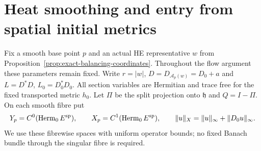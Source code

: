 \section{Heat smoothing and entry from spatial initial metrics}
\label{sec:spatial-entry}

Fix a smooth base point $p$ and an actual HE representative
$w$ from Proposition~\ref{prop:exact-balancing-coordinates}.
Throughout the flow argument these parameters remain fixed.
Write $r=|w|$, $D=D_{\mathcal A_p(w)}=D_0+a$ and
$L=D^*D$, $L_0=D_0^*D_0$. All section variables are
Hermitian and trace free for the fixed transported metric $h_0$.
Let $\Pi$ be the split projection onto $\mathfrak h$ and
$Q=I-\Pi$. On each smooth fibre put
\begin{equation}\label{eq:flow-banach-spaces}
 Y_p=C^0(\operatorname{Herm}_0E^{\rm sp}),\qquad
 X_p=C^1(\operatorname{Herm}_0E^{\rm sp}),\qquad
 \|u\|_X=\|u\|_\infty+\|D_0u\|_\infty.
\end{equation}
We use these fibrewise spaces with uniform operator bounds;
no fixed Banach bundle through the singular fibre is required.


